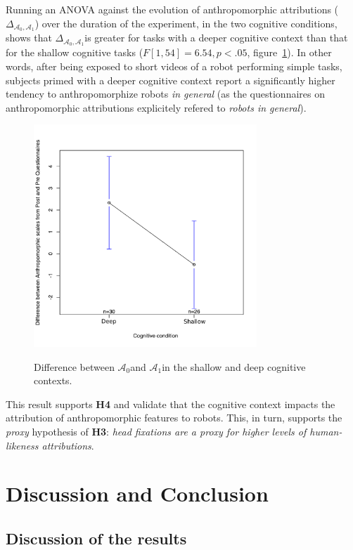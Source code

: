 \documentclass[lettersize, noapacite, twoside, HRI]{apa_HRI}
\newcommand{\h}[1]{\textbf{H#1}\xspace}
\newcommand{\anti}{{$\mathcal{A}_0$\xspace}}
\newcommand{\antf}{{$\mathcal{A}_1$\xspace}}
\newcommand{\deltaant}{{ $\Delta_{\mathcal{A}_0,\mathcal{A}_1}$\xspace}}
\begin{document}
Running an ANOVA against the evolution of anthropomorphic attributions
(\deltaant) over the duration of the experiment, in the two cognitive
conditions, shows that \deltaant is greater for tasks with a deeper cognitive
context than that for the shallow cognitive tasks ($F[1,54] = 6.54, p < .05$,
figure~\ref{h4}). In other words, after being exposed to short videos of a robot
performing simple tasks, subjects primed with a deeper cognitive context report
a significantly higher tendency to anthropomorphize robots \emph{in general} (as
the questionnaires on anthropomorphic attributions explicitely refered to
\emph{robots in general}).

\begin{figure}
    \centering
    \includegraphics[width=3.3in]{H4}\label{ICAtoAAPImprovement}
    \caption{Difference between \anti and \antf in the shallow and deep
    cognitive contexts.}
    \label{h4}
\end{figure}

This result supports \h{4} and validate that the cognitive context impacts the
attribution of anthropomorphic features to robots. This, in turn, supports the
\emph{proxy} hypothesis of \h{3}: \emph{head fixations are a proxy for higher
levels of human-likeness attributions}.


\section{Discussion and Conclusion}

\subsection{Discussion of the results}
\end{document}
